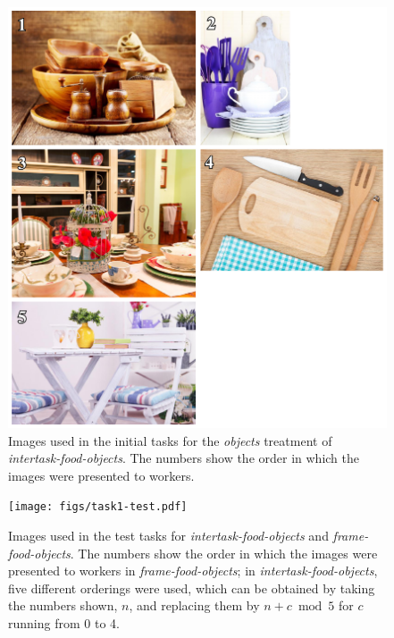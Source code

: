 \documentclass[12pt]{article}
\begin{document}
\begin{figure}
	\begin{center}
	\includegraphics{figs/task1-obj.pdf}
	\end{center}
	\caption{
		Images used in the initial tasks for the
		\textit{objects} treatment of \textit{intertask-food-objects}.  
		The numbers show the order in which the images were presented to 
		workers.
	}
	\label{fig:task1:obj}
\end{figure}

\begin{figure}
	\begin{center}
	\texttt{[image: figs/task1-test.pdf]}
	\end{center}
	\caption{
		Images used in the test tasks for \textit{intertask-food-objects}
		and \textit{frame-food-objects}.  
		The numbers show the order in which the 
		images were presented to workers in \textit{frame-food-objects};
		in \textit{intertask-food-objects}, five different orderings were
		used, which can be obtained by taking the numbers shown, $n$,
		and replacing them by $n + c \bmod 5$ for $c$ running from 0 to 4.
	}
	\label{fig:task1:test}
\end{figure}
\end{document}

